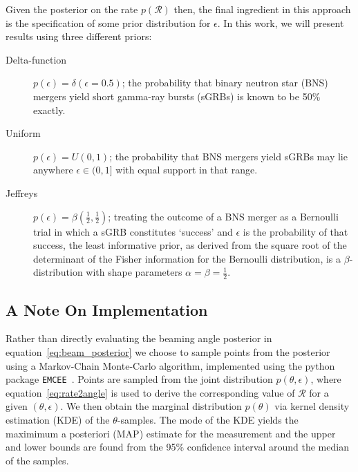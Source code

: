 \documentclass[twocolumn,nofootinbib]{revtex4-1}
\newcommand{\cbcrate}{{{\mathcal R}}}
\def\bns#1{binary neutron star#1 (BNS#1)\gdef\bns{BNS}}
\def\sgrb#1{short gamma-ray burst#1 (sGRB#1)\gdef\sgrb{sGRB}}
\begin{document}
Given the posterior on the rate $p(\cbcrate)$ then, the final ingredient in this
approach is the specification of some prior distribution for $\epsilon$.  In
this work, we will present results using three different priors:
%
\begin{description}
\item [Delta-function] $p(\epsilon) = \delta(\epsilon=0.5)$;
        the probability that \bns{} mergers yield \sgrb{s} is known to be 50\%
        exactly.

\item [Uniform] $p(\epsilon)=U(0,1)$;
        the probability that \bns{} mergers yield \sgrb{s} may lie anywhere
    $\epsilon \in (0,1]$ with equal support in that range. 

    \item [Jeffreys] $p(\epsilon)=\beta(\frac{1}{2},\frac{1}{2})$; treating the
        outcome of a \bns{} merger as a Bernoulli trial in which a \sgrb{}
        constitutes `success' and $\epsilon$ is the probability of that success,
        the least informative prior, as derived from the square root of the
        determinant of the Fisher information for the Bernoulli distribution, is
        a $\beta$-distribution with shape parameters $\alpha=\beta=\frac{1}{2}$.
\end{description}


\subsection{A Note On Implementation}
Rather than directly evaluating the beaming angle posterior in
equation~\ref{eq:beam_posterior} we choose to sample points from the posterior
using a Markov-Chain Monte-Carlo algorithm, implemented using the python package
{\tt EMCEE}~\cite{2013PASP..125..306F}.  Points are sampled from the joint
distribution $p(\theta,\epsilon)$, where equation~\ref{eq:rate2angle} is used to
derive the corresponding value of $\cbcrate$ for a given $(\theta,\epsilon)$.
We then obtain the marginal distribution $p(\theta)$ via kernel density
estimation (KDE) of the $\theta$-samples.  The mode of the KDE yields the
maximimum a posteriori (MAP) estimate for the measurement and the upper and
lower bounds are found from the 95\% confidence interval around the median of
the samples.
\end{document}

